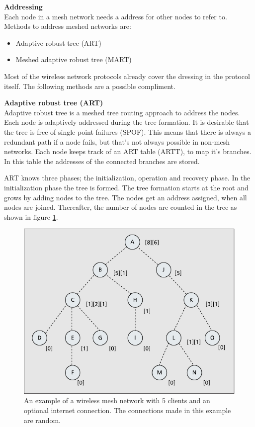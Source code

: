 \documentclass[10pt,a4paper]{article}
\begin{document}
\textbf{Addressing}\\
Each node in a mesh network needs a address for other nodes to refer to. Methods to address meshed networks are:
\begin{itemize}
\setlength\itemsep{0em}
    \item Adaptive robust tree (ART)
    \item Meshed adaptive robust tree (MART)
\end{itemize}
Most of the wireless network protocols already cover the dressing in the protocol itself. The following methods are a possible compliment.

\textbf{Adaptive robust tree (ART)}\\
Adaptive robust tree is a meshed tree routing approach to address the nodes. Each node is adaptively addressed during the tree formation. It is desirable that the tree is free of single point failures (SPOF). This means that there is always a redundant path if a node fails, but that's not always possible in non-mesh networks. Each node keeps track of an ART table (ARTT), to map it's branches. In this table the addresses of the connected branches are stored.

ART knows three phases; the initialization, operation and recovery phase. In the initialization phase the tree is formed. The tree formation starts at the root and grows by adding nodes to the tree. The nodes get an address assigned, when all nodes are joined. Thereafter, the number of nodes are counted in the tree as shown in figure \ref{fig:treenumbers}.


\begin{figure}[H]
   \centering
   \includegraphics[width=1\textwidth]{treenumbers}
   \caption{An example of a wireless mesh network with 5 clients and an optional internet connection. The connections made in this example are random.}
   \label{fig:treenumbers}
\end{figure}
\end{document}
